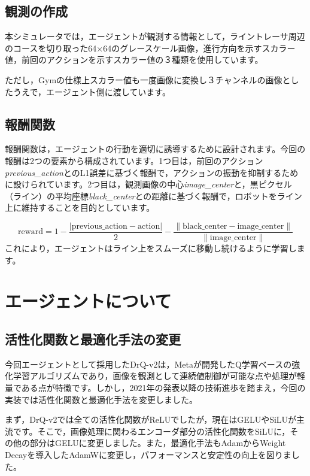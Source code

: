 \subsection{観測の作成}
本シミュレータでは，エージェントが観測する情報として，ライントレーサ周辺のコースを切り取った64×64のグレースケール画像，進行方向を示すスカラー値，前回のアクションを示すスカラー値の３種類を使用しています。

ただし，Gymの仕様上スカラー値も一度画像に変換し３チャンネルの画像としたうえで，エージェント側に渡しています。

\subsection{報酬関数}
報酬関数は，エージェントの行動を適切に誘導するために設計されます。今回の報酬は2つの要素から構成されています。1つ目は，前回のアクション\textit{previous\_action}とのL1誤差に基づく報酬で，アクションの振動を抑制するために設けられています。2つ目は，観測画像の中心\textit{image\_center}と，黒ピクセル（ライン）の平均座標\textit{black\_center}との距離に基づく報酬で，ロボットをライン上に維持することを目的としています。

\[
\text{reward} = 1 - \frac{| \text{previous\_action} - \text{action} |}{2} - \frac{\| \text{black\_center} - \text{image\_center} \|}{\| \text{image\_center} \|}
\]
これにより，エージェントはライン上をスムーズに移動し続けるように学習します。

\section{エージェントについて}

\subsection{活性化関数と最適化手法の変更}
今回エージェントとして採用したDrQ-v2\cite{yarats2021masteringvisualcontinuouscontrol}は，Metaが開発したQ学習ベースの強化学習アルゴリズムであり，画像を観測として連続値制御が可能な点や処理が軽量である点が特徴です。しかし，2021年の発表以降の技術進歩を踏まえ，今回の実装では活性化関数と最適化手法を変更しました。

まず，DrQ-v2では全ての活性化関数がReLUでしたが，現在はGELUやSiLUが主流です。そこで，画像処理に関わるエンコーダ部分の活性化関数をSiLUに，その他の部分はGELUに変更しました。また，最適化手法もAdamからWeight Decayを導入したAdamWに変更し，パフォーマンスと安定性の向上を図りました。

